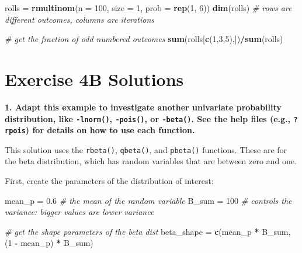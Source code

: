 \documentclass[]{book}
\newenvironment{Shaded}{\begin{snugshade}}{\end{snugshade}}
\newcommand{\KeywordTok}[1]{\textcolor[rgb]{0.13,0.29,0.53}{\textbf{#1}}}
\newcommand{\DataTypeTok}[1]{\textcolor[rgb]{0.13,0.29,0.53}{#1}}
\newcommand{\DecValTok}[1]{\textcolor[rgb]{0.00,0.00,0.81}{#1}}
\newcommand{\FloatTok}[1]{\textcolor[rgb]{0.00,0.00,0.81}{#1}}
\newcommand{\StringTok}[1]{\textcolor[rgb]{0.31,0.60,0.02}{#1}}
\newcommand{\CommentTok}[1]{\textcolor[rgb]{0.56,0.35,0.01}{\textit{#1}}}
\newcommand{\OperatorTok}[1]{\textcolor[rgb]{0.81,0.36,0.00}{\textbf{#1}}}
\newcommand{\NormalTok}[1]{#1}
\theoremstyle{definition}
\theoremstyle{definition}
\theoremstyle{definition}
\theoremstyle{remark}
\begin{document}
\begin{Shaded}
\begin{Highlighting}[]
\NormalTok{rolls =}\StringTok{ }\KeywordTok{rmultinom}\NormalTok{(}\DataTypeTok{n =} \DecValTok{100}\NormalTok{, }\DataTypeTok{size =} \DecValTok{1}\NormalTok{, }\DataTypeTok{prob =} \KeywordTok{rep}\NormalTok{(}\DecValTok{1}\NormalTok{, }\DecValTok{6}\NormalTok{))}
\KeywordTok{dim}\NormalTok{(rolls) }\CommentTok{#  rows are different outcomes, columns are iterations}

\CommentTok{# get the fraction of odd numbered outcomes}
\KeywordTok{sum}\NormalTok{(rolls[}\KeywordTok{c}\NormalTok{(}\DecValTok{1}\NormalTok{,}\DecValTok{3}\NormalTok{,}\DecValTok{5}\NormalTok{),])}\OperatorTok{/}\KeywordTok{sum}\NormalTok{(rolls)}
\end{Highlighting}
\end{Shaded}

\hypertarget{ex4b-answers}{\section*{Exercise 4B
Solutions}\label{ex4b-answers}}

\textbf{1. Adapt this example to investigate another univariate
probability distribution, like \texttt{-lnorm()}, \texttt{-pois()}, or
\texttt{-beta()}. See the help files (e.g., \texttt{?rpois}) for details
on how to use each function.}

This solution uses the \texttt{rbeta()}, \texttt{qbeta()}, and
\texttt{pbeta()} functions. These are for the beta distribution, which
has random variables that are between zero and one.

First, create the parameters of the distribution of interest:

\begin{Shaded}
\begin{Highlighting}[]
\NormalTok{mean_p =}\StringTok{ }\FloatTok{0.6}  \CommentTok{# the mean of the random variable}
\NormalTok{B_sum =}\StringTok{ }\DecValTok{100}   \CommentTok{# controls the variance: bigger values are lower variance}

\CommentTok{# get the shape parameters of the beta dist}
\NormalTok{beta_shape =}\StringTok{ }\KeywordTok{c}\NormalTok{(mean_p }\OperatorTok{*}\StringTok{ }\NormalTok{B_sum, (}\DecValTok{1} \OperatorTok{-}\StringTok{ }\NormalTok{mean_p) }\OperatorTok{*}\StringTok{ }\NormalTok{B_sum)}
\end{Highlighting}
\end{Shaded}
\end{document}
